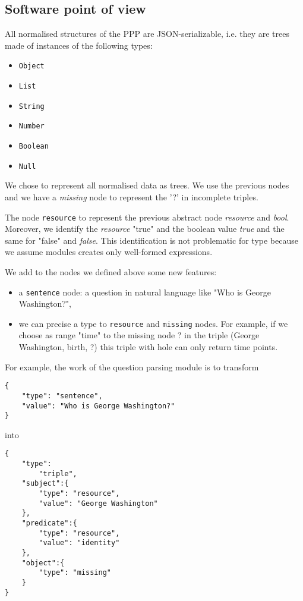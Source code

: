 \subsection{Software point of view}

All normalised structures of the PPP are JSON-serializable, i.e. they are trees made of instances of the following types:
\begin{itemize}
    \item \texttt{Object}
    \item \texttt{List}
    \item \texttt{String}
    \item \texttt{Number}
    \item \texttt{Boolean}
    \item \texttt{Null}
\end{itemize}

We chose to represent all normalised data as trees. We use the previous nodes and we have a \textsl{missing} node to represent the '?' in incomplete triples.

The node \texttt{resource} to represent the previous abstract node \textsl{resource} and \textsl{bool}. Moreover, we identify the \textsl{resource} "true" and the boolean value \textsl{true} and the same for "false" and \textsl{false}. This identification is not problematic for type because we assume modules creates only well-formed expressions.

We add to the nodes we defined above some new features:
\begin{itemize}
    \item a \texttt{sentence} node: a question in natural language like "Who is George Washington?",
    \item we can precise a type to \texttt{resource} and \texttt{missing} nodes. For example, if we choose as range "time" to the missing node ? in the triple (George Washington, birth, ?) this triple with hole can only return time points.
\end{itemize}

For example, the work of the question parsing module is to transform 
\begin{verbatim}
{
    "type": "sentence", 
    "value": "Who is George Washington?"
}
\end{verbatim}
into 
\begin{verbatim}
{
    "type":
        "triple",
    "subject":{
        "type": "resource",
        "value": "George Washington"
    },
    "predicate":{
        "type": "resource",
        "value": "identity"
    },
    "object":{
        "type": "missing"
    }
}
\end{verbatim}

